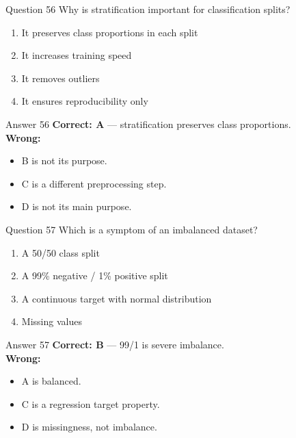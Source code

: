 \documentclass[aspectratio=169,11pt]{beamer}
\begin{document}
	\begin{frame}{Question 56}
		Why is stratification important for classification splits?
		\begin{enumerate}[label=\Alph*.]
			\item It preserves class proportions in each split
			\item It increases training speed
			\item It removes outliers
			\item It ensures reproducibility only
		\end{enumerate}
	\end{frame}
	\begin{frame}{Answer 56}
		\textbf{Correct: A} --- stratification preserves class proportions.\\
		\vspace{0.5em}
		\textbf{Wrong:}
		\begin{itemize}
			\item B is not its purpose.
			\item C is a different preprocessing step.
			\item D is not its main purpose.
		\end{itemize}
	\end{frame}
	
	\begin{frame}{Question 57}
		Which is a symptom of an imbalanced dataset?
		\begin{enumerate}[label=\Alph*.]
			\item A 50/50 class split
			\item A 99\% negative / 1\% positive split
			\item A continuous target with normal distribution
			\item Missing values
		\end{enumerate}
	\end{frame}
	\begin{frame}{Answer 57}
		\textbf{Correct: B} --- 99/1 is severe imbalance.\\
		\vspace{0.5em}
		\textbf{Wrong:}
		\begin{itemize}
			\item A is balanced.
			\item C is a regression target property.
			\item D is missingness, not imbalance.
		\end{itemize}
	\end{frame}
	
\end{document}
